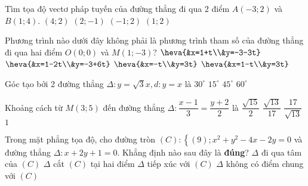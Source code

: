 \begin{ex}%
Tìm tọa độ vectơ pháp tuyến của đường thẳng đi qua 2 điểm $A(-3 ; 2)$ và $B(1 ; 4)$.
\choice
{$(4 ; 2)$}
{$(2 ;-1)$}
{\True $(-1 ; 2)$}
{$(1 ; 2)$}
\end{ex}
\begin{ex}%
Phương trình nào dưới đây không phải là phương trình tham số của đường thẳng đi qua hai điểm $O(0;0)$ và $M(1 ;-3)$?
\choice
{$\heva{&x=1+t\\&y=-3-3t}$}
{$\heva{&x=1-2t\\&y=-3+6t}$}
{$\heva{&x=-t\\&y=3t}$}
{\True $\heva{&x=1-t\\&y=3t}$}
\end{ex}
\begin{ex}%
Góc tạo bởi 2 đường thẳng $\Delta\colon y=\sqrt{3}x, d\colon y=x$ là
\choice
{$30^{\circ}$}
{\True $15^{\circ}$}
{$45^{\circ}$}
{$60^{\circ}$}
\end{ex}
\begin{ex}%
Khoảng cách từ $M(3 ; 5)$ đến đường thẳng $\Delta\colon \dfrac{x-1}{3}=\dfrac{y+2}{2}$ là
\choice
{$\dfrac{\sqrt{15}}{2}$}
{$\dfrac{\sqrt{13}}{17}$}
{\True $\dfrac{17}{\sqrt{13}}$}
{$1$}
\end{ex}
\begin{ex}%
Trong mặt phẳng tọa độ, cho đường tròn $(C)\colon\left\{(9) ; x^2+y^2-4 x-2 y=0\right.$ và đường thẳng $\Delta\colon x+2 y+1=0$. Khẳng định nào sau đây là \textbf{đúng}?
\choice
{$\Delta$ đi qua tâm của $(C)$}
{$\Delta$ cắt $(C)$ tại hai điểm}
{\True $\Delta$ tiếp xúc với $(C)$}
{$\Delta$ không có điểm chung với $(C)$}
\end{ex}
